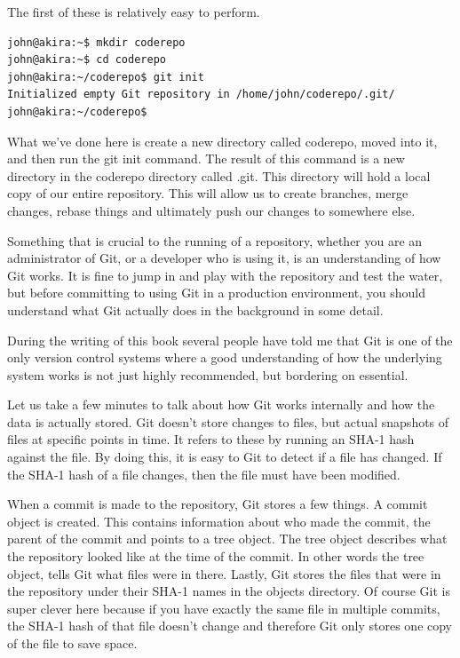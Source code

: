The first of these is relatively easy to perform.  

\begin{Verbatim}[frame=leftline,framerule=1mm,fontsize=\relsize{-3}]
john@akira:~$ mkdir coderepo 
john@akira:~$ cd coderepo 
john@akira:~/coderepo$ git init 
Initialized empty Git repository in /home/john/coderepo/.git/ 
john@akira:~/coderepo$
\end{Verbatim}

What we've done here is create a new directory called coderepo, moved into it, and then run the git init command.  The result of this command is a new directory in the coderepo directory called .git.  This directory will hold a local copy of our entire repository.  This will allow us to create branches, merge changes, rebase things and ultimately push our changes to somewhere else.

Something that is crucial to the running of a repository, whether you are an administrator of Git, or a developer who is using it, is an understanding of how Git works.  It is fine to jump in and play with the repository and test the water, but before committing to using Git in a production environment, you should understand what Git actually does in the background in some detail. 

During the writing of this book several people have told me that Git is one of the only version control systems where a good understanding of how the underlying system works is not just highly recommended, but bordering on essential. 

Let us take a few minutes to talk about how Git works internally and how the data is actually stored.  Git doesn't store changes to files, but actual snapshots of files at specific points in time.  It refers to these by running an SHA-1 hash against the file.  By doing this, it is easy to Git to detect if a file has changed.  If the SHA-1 hash of a file changes, then the file must have been modified. 

When a commit is made to the repository, Git stores a few things.  A commit object is created.  This contains information about who made the commit, the parent of the commit and points to a tree object.  The tree object describes what the repository looked like at the time of the commit.  In other words the tree object, tells Git what files were in there.  Lastly, Git stores the files that were in the repository under their SHA-1 names in the objects directory.  Of course Git is super clever here because if you have exactly the same file in multiple commits, the SHA-1 hash of that file doesn't change and therefore Git only stores one copy of the file to save space.

